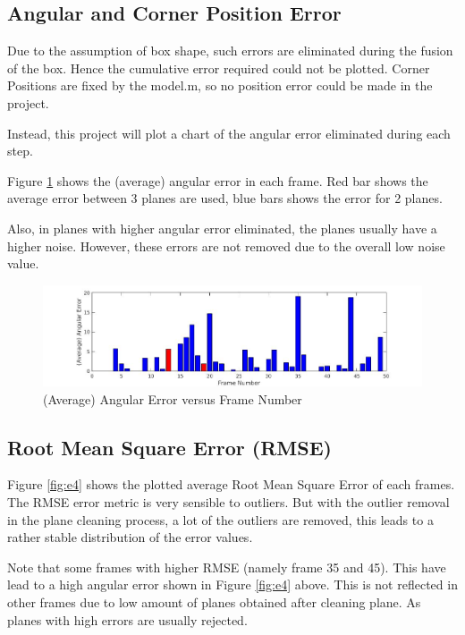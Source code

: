 \documentclass[10pt,a4paper]{article}
\begin{document}
\subsection{Angular and Corner Position Error}

Due to the assumption of box shape, such errors are eliminated during the fusion of the box.
Hence the cumulative error required could not be plotted.
Corner Positions are fixed by the model.m, so no position error could be made in the project.

Instead, this project will plot a chart of the angular error eliminated during each step. 

Figure \ref{fig:e3} shows the (average) angular error in each frame.
Red bar shows the average error between 3 planes are used, blue bars shows the error for 2 planes.

Also, in planes with higher angular error eliminated, the planes usually have a higher noise. However, these errors are not removed due to the overall low noise value.

\vspace{-10pt}
\hspace{-40pt}
\begin{figure}[!h]
		\includegraphics[scale=0.4]{angularerror.jpg}
		\caption{ \small (Average) Angular Error versus Frame Number}
		\label{fig:e3}
\end{figure}

\newpage

\subsection{Root Mean Square Error (RMSE)}

Figure \ref{fig:e4} shows the plotted average Root Mean Square Error of each frames.
The RMSE error metric is very sensible to outliers.
But with the outlier removal in the plane cleaning process, a lot of the outliers are removed, this leads to a rather stable distribution of the error values.

Note that some frames with higher RMSE (namely frame 35 and 45). This have lead to a high angular error shown in Figure \ref{fig:e4} above. 
This is not reflected in other frames due to low amount of planes obtained after cleaning plane.
As planes with high errors are usually rejected. 
\end{document}
